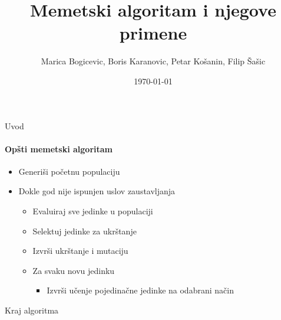 \documentclass{beamer}
\title{Memetski algoritam i njegove primene}
\subtitle{}
\date{\today}
\author{Marica Bogicevic, Boris Karanovic, Petar Košanin, Filip Šašic}
\institute{Matematicki Fakultet}
\begin{document}
\maketitle


  



\begin{frame}[fragile]{Uvod}
  \framesubtitle{Opšti memetski algoritam}
  
   \begin{itemize}
    \item{Generiši početnu populaciju}
    \item{Dokle god nije ispunjen uslov zaustavljanja}
        \begin{itemize}
             \item{Evaluiraj sve jedinke u populaciji}
             \item{Selektuj jedinke za ukrštanje}
             \item{Izvrši ukrštanje i mutaciju}
             \item{Za svaku novu jedinku}
                \begin{itemize}
                     \item{Izvrši učenje pojedinačne jedinke na odabrani način}
                \end{itemize}
        \end{itemize}
  \end{itemize}
  \item{Kraj algoritma}

\end{frame}
\end{document}
